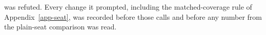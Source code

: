 was refuted. Every change it prompted, including the
matched-coverage rule of Appendix~\ref{app-seat}, was recorded before those
calls and before any number from the plain-seat comparison was read.

